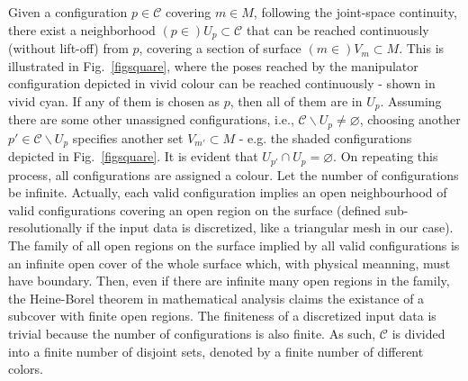 \documentclass[journal]{IEEEtran}
\begin{document}
Given a configuration $p \in \mathscr{C}$ covering $m\in M$, following the joint-space continuity, there exist a neighborhood $(p\in)U_p\subset \mathscr{C}$ that can be reached continuously (without lift-off) from $p$, covering a section of surface 
$(m\in )V_{m}\subset M$. This is illustrated in Fig.~\ref{figsquare}, where the poses reached by the manipulator 
configuration depicted in vivid colour can be reached continuously - shown in vivid cyan. 
If any of them is chosen as $p$, then all of them are in $U_p$. 
Assuming there are some other unassigned configurations, i.e., $\mathscr{C}\backslash U_p\neq \varnothing$, 
choosing another  $p'\in \mathscr{C}\backslash U_p$ specifies another set $V_{m'}\subset M$ - e.g. the shaded 
configurations depicted in Fig.~\ref{figsquare}. 
It is evident that $U_{p'} \cap U_{p} = \varnothing$. %
On repeating this process, all configurations are assigned a colour. 
Let the number of configurations be infinite. Actually, each valid configuration implies an open neighbourhood of valid configurations covering an open region on the surface (defined sub-resolutionally if the input data is discretized, like a triangular mesh in our case). The family of all open regions on the surface implied by all valid configurations is an infinite open cover of the whole surface which, with physical meanning, must have boundary. Then, even if there are infinite many open regions in the family, the Heine-Borel theorem in mathematical analysis claims the existance of a subcover with finite open regions. The finiteness of a discretized input data is trivial because the number of configurations is also finite.
As such, $\mathscr{C}$ is divided into a finite number of disjoint sets, denoted by a finite number of different colors. 
\end{document}
